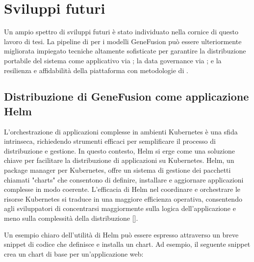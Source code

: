 % 
% 
% 



\clearpage
\cleardoublepage

\chapter{Sviluppi futuri}

Un ampio spettro di sviluppi futuri è stato individuato nella cornice di questo lavoro di tesi. La pipeline di  per i modelli GeneFusion può essere ulteriormente migliorata impiegato tecniche altamente sofisticate per garantire la distribuzione portabile del sistema come applicativo  via ; la data governance via ; e la resilienza e affidabilità della piattaforma con metodologie di .

\section{Distribuzione di GeneFusion come applicazione Helm}

L'orchestrazione di applicazioni complesse in ambienti Kubernetes è una sfida intrinseca, richiedendo strumenti efficaci per semplificare il processo di distribuzione e gestione. In questo contesto, Helm si erge come una soluzione chiave per facilitare la distribuzione di applicazioni su Kubernetes. Helm, un package manager per Kubernetes, offre un sistema di gestione dei pacchetti chiamati "charts" che consentono di definire, installare e aggiornare applicazioni complesse in modo coerente. L'efficacia di Helm nel coordinare e orchestrare le risorse Kubernetes si traduce in una maggiore efficienza operativa, consentendo agli sviluppatori di concentrarsi maggiormente sulla logica dell'applicazione e meno sulla complessità della distribuzione [\cite{helm_official}].

Un esempio chiaro dell'utilità di Helm può essere espresso attraverso un breve snippet di codice che definisce e installa un chart. Ad esempio, il seguente snippet crea un chart di base per un'applicazione web:


